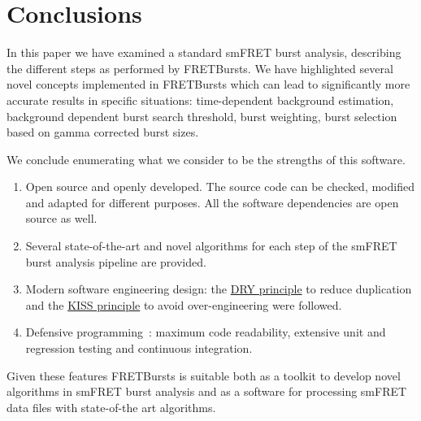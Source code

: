 \section{Conclusions}
\label{sec:conclusions}

In this paper we have examined a standard smFRET burst analysis, describing
the different steps as performed by FRETBursts.
We have highlighted several novel concepts implemented in FRETBursts which
can lead to significantly more accurate results in specific situations:
time-dependent background estimation, background dependent burst search threshold,
burst weighting, burst selection based on gamma corrected burst sizes.

We conclude enumerating what we consider to be the strengths
of this software.

\begin{enumerate}
\item Open source and openly developed. The source code can be checked, modified and
adapted for different purposes. All the software dependencies are open source as well.
\item Several state-of-the-art and novel algorithms for each step of the
smFRET burst analysis pipeline are provided.
\item Modern software engineering design: the
\href{http://en.wikipedia.org/wiki/Don\%27t_repeat_yourself}{DRY principle}
to reduce duplication and the
\href{http://en.wikipedia.org/wiki/KISS_principle}{KISS principle}
to avoid over-engineering were followed.
\item Defensive programming~\cite{Prli__2012}: maximum code readability,
extensive unit and regression testing and continuous integration.
\end{enumerate}

Given these features FRETBursts is suitable both as a toolkit to develop novel algorithms
in smFRET burst analysis and as a software for processing smFRET data files with
state-of-the art algorithms.

